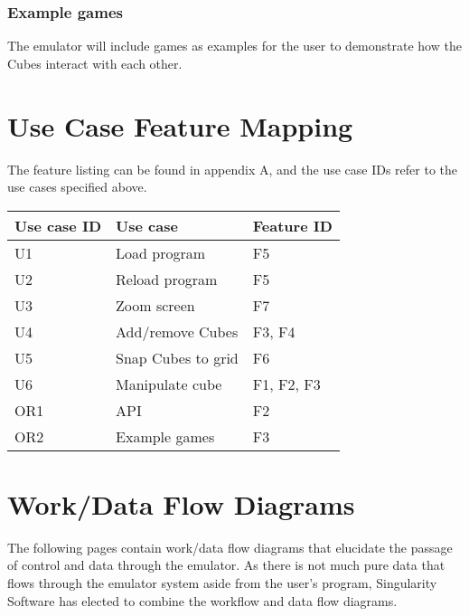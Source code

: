 \documentclass[12pt]{article}
\begin{document}
	\subsubsection{Example games}
		The emulator will include games as examples for the user to demonstrate how the Cubes interact with each other.

\newpage
\section{Use Case Feature Mapping}
    The feature listing can be found in appendix A, and the use case IDs refer to the use cases specified above.
    \begin{table}[h]
      \begin{tabular}{l | l | l}
        \textbf{Use case ID} &
        \textbf{Use case} &
        \textbf{Feature ID} \\ \hline

        U1 &
        Load program &
        F5 \\

        U2 &
        Reload program &
        F5 \\

        U3 &
        Zoom screen &
        F7 \\

        U4 &
        Add/remove Cubes &
        F3, F4\\

        U5 &
        Snap Cubes to grid &
        F6 \\

        U6 &
        Manipulate cube &
        F1, F2, F3 \\
		
	OR1 & 
	API &
	F2 \\
		
	OR2 &
	Example games &
	F3 \\

      \end{tabular}
    \end{table}

\section{Work/Data Flow Diagrams}
The following pages contain work/data flow diagrams that elucidate the passage of control and data through the emulator. As there is not much pure data that flows through the emulator system aside from the user's program, Singularity Software has elected to combine the workflow and data flow diagrams.
\end{document}
